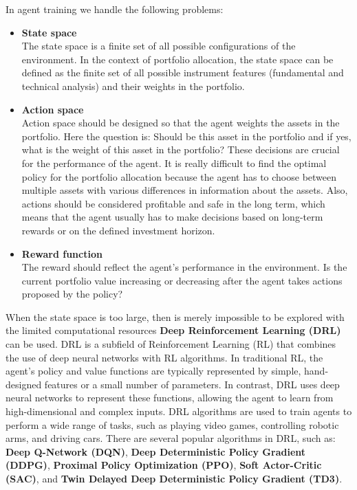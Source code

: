 \documentclass[../xlapes02]{subfiles}
\begin{document}
    In agent training we handle the following problems:
    \begin{itemize}
        \item \textbf{State space}\\
        The state space is a finite set of all possible configurations of the environment.
        In the context of portfolio allocation, the state space can be defined as the finite set of all possible instrument features (fundamental and technical analysis) and their weights in the portfolio.
        \item \textbf{Action space} \\
        Action space should be designed so that the agent weights the assets in the portfolio.
        Here the question is: Should be this asset in the portfolio and if yes, what is the weight of this asset in the portfolio?
        These decisions are crucial for the performance of the agent.
        It is really difficult to find the optimal policy for the portfolio allocation because the agent has to choose between multiple assets with various differences in information about the assets.
        Also, actions should be considered profitable and safe in the long term, which means that the agent usually has to make decisions based on long-term rewards or on the defined investment horizon.
        \item \textbf{Reward function}\\
        The reward should reflect the agent's performance in the environment.
        Is the current portfolio value increasing or decreasing after the agent takes actions proposed by the policy?
    \end{itemize}

    When the state space is too large, then is merely impossible to be explored with the limited computational resources \textbf{Deep Reinforcement Learning (DRL)} can be used.
    DRL is a subfield of Reinforcement Learning (RL) that combines the use of deep neural networks with RL algorithms.
    In traditional RL, the agent's policy and value functions are typically represented by simple, hand-designed features or a small number of parameters.
    In contrast, DRL uses deep neural networks to represent these functions, allowing the agent to learn from high-dimensional and complex inputs.
    DRL algorithms are used to train agents to perform a wide range of tasks, such as playing video games, controlling robotic arms, and driving cars.
    There are several popular algorithms in DRL, such as:
    \textbf{Deep Q-Network (DQN)},
    \textbf{Deep Deterministic Policy Gradient (DDPG)},
    \textbf{Proximal Policy Optimization (PPO)},
    \textbf{Soft Actor-Critic (SAC)},
    and \textbf{Twin Delayed Deep Deterministic Policy Gradient (TD3)}.
\end{document}
